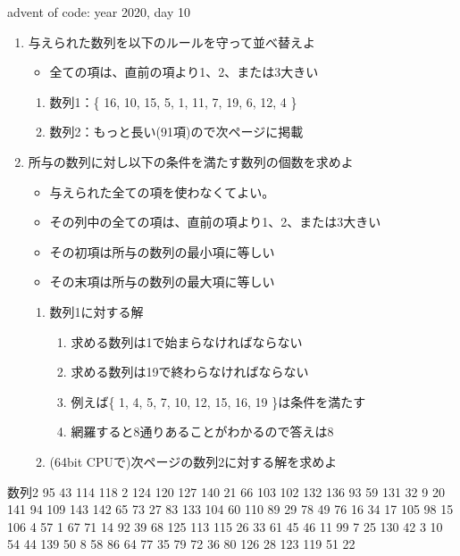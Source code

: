 \documentclass{beamer}
\begin{document}
\begin{frame}[fragile]{advent of code: year 2020, day 10}{}
\begin{enumerate}\itemsep8pt
\item 与えられた数列を以下のルールを守って並べ替えよ
\begin{itemize}%
\item 全ての項は、直前の項より1、2、または3大きい
\end{itemize}
\begin{enumerate}%
\item 数列1：\{ 16, 10, 15, 5, 1, 11, 7, 19, 6, 12, 4 \}
\item 数列2：もっと長い(91項)ので次ページに掲載
\end{enumerate}
\item 所与の数列に対し以下の条件を満たす数列の個数を求めよ
\begin{itemize}%
\item 与えられた全ての項を使わなくてよい。
\item その列中の全ての項は、直前の項より1、2、または3大きい
\item その初項は所与の数列の最小項に等しい
\item その末項は所与の数列の最大項に等しい
\end{itemize}
\begin{enumerate}%
\item 数列1に対する解
\begin{enumerate}%
\item 求める数列は1で始まらなければならない
\item 求める数列は19で終わらなければならない
\item 例えば\{ 1, 4, 5, 7, 10, 12, 15, 16, 19 \}は条件を満たす
\item 網羅すると8通りあることがわかるので答えは8
\end{enumerate}
\item (64bit CPUで)次ページの数列2に対する解を求めよ
\end{enumerate}
\end{enumerate}
\end{frame}

\begin{frame}[fragile]{数列2}{}
95
43
114
118
2
124
120
127
140
21
66
103
102
132
136
93
59
131
32
9
20
141
94
109
143
142
65
73
27
83
133
104
60
110
89
29
78
49
76
16
34
17
105
98
15
106
4
57
1
67
71
14
92
39
68
125
113
115
26
33
61
45
46
11
99
7
25
130
42
3
10
54
44
139
50
8
58
86
64
77
35
79
72
36
80
126
28
123
119
51
22

\end{frame}
\end{document}

